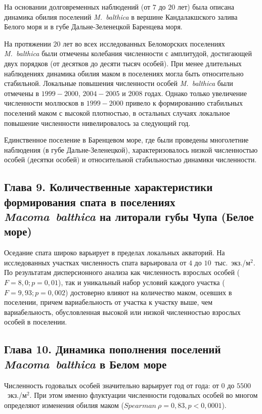 {На основании долговременных наблюдений (от $7$ до $20$ лет) была описана динамика обилия поселений \textit{M.~balthica} в вершине Кандалакшского залива Белого моря и в губе Дальне-Зеленецкой Баренцева моря.

На протяжении $20$ лет во всех исследованных Беломорских поселениях \textit{M.~balthica} были отмечены колебания численности с амплитудой, достигающей двух порядков (от десятков до десяти тысяч особей).
При менее длительных наблюдениях динамика обилия маком в поселениях могла быть относительно стабильной.
Локальные повышения численности особей \textit{M.~balthica} были отмечены в $1999-2000$, $2004-2005$ и $2008$ годах.
Однако только увеличение численности моллюсков в $1999-2000$ привело к формированию стабильных поселений маком с высокой плотностью, в остальных случаях локальное повышение численности нивелировалось за следующий год.

Единственное поселение в Баренцевом море, где были проведены многолетние наблюдения (в губе Дальне-Зеленецкой), характеризовалось низкой численностью особей (десятки особей) и относительной стабильностью динамики численности. 

\subsection*{Глава 9. Количественные характеристики формирования спата в поселениях \textit{Macoma~balthica} на литорали губы Чупа (Белое море)} 

Оседание спата широко варьирует в пределах локальных акваторий.
На исследованных участках численность спата варьировала от $4$ до $10$~тыс.~экз./м$^2$.
По результатам дисперсионного анализа как численность взрослых особей ($F = 8,0; p = 0,01$), так и уникальный набор условий каждого участка ($F = 9,93; p = 0,002$) достоверно влияют на количество маком, осевших в поселении, причем вариабельность от участка к участку выше, чем вариабельность, обусловленная высокой или низкой численностью взрослых особей в поселении. 

\subsection*{Глава 10. Динамика пополнения поселений \textit{Macoma~balthica} в Белом море}

Численность годовалых особей значительно варьирует год от года: от $0$ до $5500$~экз./м$^2$.
При этом именно флуктуации численности годовалых особей во многом определяют изменения обилия маком ($Spearman\ \rho = 0,83, p < 0,0001$).

}
